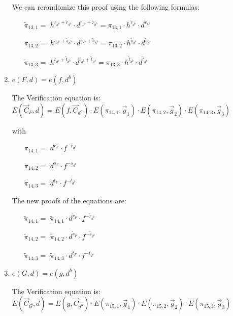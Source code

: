 \begin{description}
\begin{enumerate}
    We can rerandomize this proof using the following formulas:

    \begin{itemize}
    \item[$\tilde{\pi}_{13,1} = $] $h^{r_{d^b}+\tilde{r}_{d^b}} \cdot d^{r_{h^b}+\tilde{r}_{h^b}} = \pi_{13,1} \cdot h^{\tilde{r}_{d^b}} \cdot d^{\tilde{r}_{h^b}}$
    \item[$\tilde{\pi}_{13,2} = $] $h^{s_{d^b}+\tilde{s}_{d^b}} \cdot d^{s_{h^b}+\tilde{s}_{h^b}} = \pi_{13,2} \cdot h^{\tilde{s}_{d^b}} \cdot d^{\tilde{s}_{h^b}}$
    \item[$\tilde{\pi}_{13,3} = $] $h^{t_{d^b}+\tilde{t}_{d^b}} \cdot d^{t_{h^b}+\tilde{t}_{h^b}} = \pi_{13,3} \cdot h^{\tilde{t}_{d^b}} \cdot d^{\tilde{t}_{h^b}}$
    \end{itemize}


  \item \label{relationfd}
    $e(\boxed{F},d) = e(f, \boxed{d^b})$

    The Verification equation is: $E(\vec{C}_F, d) = E(f, \vec{C}_{d^b}) \cdot E(\pi_{14,1}, \vec{g}_1)\cdot E(\pi_{14,2}, \vec{g}_2)\cdot E(\pi_{14,3}, \vec{g}_3)$

    with

    \begin{itemize}
    \item[$\pi_{14,1} = $] $d^{r_F} \cdot f^{-r_{d^b}}$    
    \item[$\pi_{14,2} = $] $d^{s_F} \cdot f^{-s_{d^b}}$    
    \item[$\pi_{14,3} = $] $d^{t_F} \cdot f^{-t_{d^b}}$
    \end{itemize}

    The new proofs of the equations are:
    \begin{itemize}
    \item[$\tilde{\pi}_{14,1} = $] $\tilde{\pi}_{14,1} \cdot d^{\tilde{r}_F} \cdot f^{-\tilde{r}_{d^b}}$    
    \item[$\tilde{\pi}_{14,2} = $] $\tilde{\pi}_{14,2} \cdot d^{\tilde{s}_F} \cdot f^{-\tilde{s}_{d^b}}$    
    \item[$\tilde{\pi}_{14,3} = $] $\tilde{\pi}_{14,3} \cdot d^{\tilde{t}_F} \cdot f^{-\tilde{t}_{d^b}}$
    \end{itemize}


  \item \label{relationgd}
    $e(\boxed{G},d) = e(g, \boxed{d^b})$

    The Verification equation is: $E(\vec{C}_G, d) = E(g, \vec{C}_{d^b}) \cdot E(\pi_{15,1}, \vec{g}_1)\cdot E(\pi_{15,2}, \vec{g}_2)\cdot E(\pi_{15,3}, \vec{g}_3)$


\end{enumerate}
\end{description}
